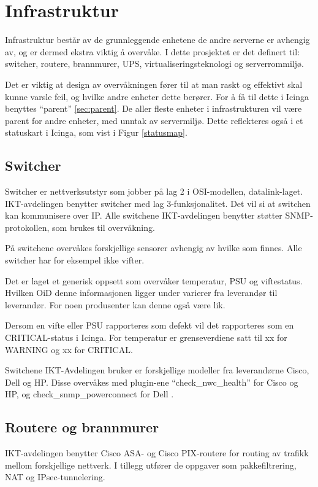 \section{Infrastruktur}
Infrastruktur består av de grunnleggende enhetene de andre serverne er avhengig av, og er dermed ekstra viktig å overvåke. I dette prosjektet er det definert til: switcher, routere, brannmurer, UPS, virtualiseringsteknologi og serverrommiljø.

Det er viktig at design av overvåkningen fører til at man raskt og effektivt skal kunne varsle feil, og hvilke andre enheter dette berører. For å få til dette i Icinga benyttes ``parent'' \ref{sec:parent}. De aller fleste enheter i infrastrukturen vil være parent for andre enheter, med unntak av servermiljø. Dette reflekteres også i et statuskart i Icinga, som vist i Figur \ref{statusmap}.

\subsection{Switcher}\label{sec:switch}
Switcher er nettverksutstyr som jobber på lag 2 i OSI-modellen, datalink-laget. IKT-avdelingen benytter switcher med lag 3-funksjonalitet. Det vil si at switchen kan kommunisere over IP. Alle switchene IKT-avdelingen benytter støtter SNMP-protokollen, som brukes til overvåkning.

På switchene overvåkes forskjellige sensorer avhengig av hvilke som finnes. Alle switcher har for eksempel ikke vifter.

Det er laget et generisk oppsett som overvåker temperatur, PSU og viftestatus. Hvilken OiD denne informasjonen ligger under varierer fra leverandør til leverandør. For noen produsenter kan denne også være lik. 

Dersom en vifte eller PSU rapporteres som defekt vil det rapporteres som en CRITICAL-status i Icinga. For temperatur er grenseverdiene satt til xx for WARNING og xx for CRITICAL.

Switchene IKT-Avdelingen bruker er forskjellige modeller fra leverandørne Cisco, Dell og HP. Disse overvåkes med plugin-ene ``check\_nwc\_health'' \cite{checknwc} for Cisco og HP, og check\_snmp\_powerconnect for Dell \cite{checkpowerconnect}.

\subsection{Routere og brannmurer}
IKT-avdelingen benytter Cisco ASA- og Cisco PIX-routere for routing av trafikk mellom forskjellige nettverk. I tillegg utfører de oppgaver som pakkefiltrering, NAT og IPsec-tunnelering.

